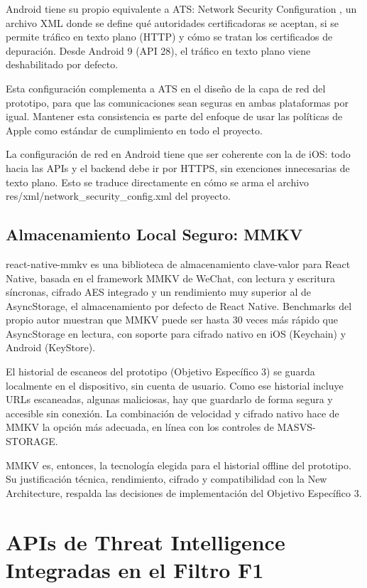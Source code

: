 Android tiene su propio equivalente a ATS: Network Security Configuration \cite{android_netsecconfig}, un archivo XML donde se define qu\'e autoridades certificadoras se aceptan, si se permite tr\'afico en texto plano (HTTP) y c\'omo se tratan los certificados de depuraci\'on. Desde Android 9 (API 28), el tr\'afico en texto plano viene deshabilitado por defecto.

Esta configuraci\'on complementa a ATS en el dise\~no de la capa de red del prototipo, para que las comunicaciones sean seguras en ambas plataformas por igual. Mantener esta consistencia es parte del enfoque de usar las pol\'iticas de Apple como est\'andar de cumplimiento en todo el proyecto.

La configuraci\'on de red en Android tiene que ser coherente con la de iOS: todo hacia las APIs y el backend debe ir por HTTPS, sin exenciones innecesarias de texto plano. Esto se traduce directamente en c\'omo se arma el archivo res/xml/network\_security\_config.xml del proyecto.

\subsection{Almacenamiento Local Seguro: MMKV}

react-native-mmkv \cite{rousavy_mmkv} es una biblioteca de almacenamiento clave-valor para React Native, basada en el framework MMKV de WeChat, con lectura y escritura s\'incronas, cifrado AES integrado y un rendimiento muy superior al de AsyncStorage, el almacenamiento por defecto de React Native. Benchmarks del propio autor \cite{rousavy_storagebenchmark} muestran que MMKV puede ser hasta 30 veces m\'as r\'apido que AsyncStorage en lectura, con soporte para cifrado nativo en iOS (Keychain) y Android (KeyStore).

El historial de escaneos del prototipo (Objetivo Espec\'ifico 3) se guarda localmente en el dispositivo, sin cuenta de usuario. Como ese historial incluye URLs escaneadas, algunas maliciosas, hay que guardarlo de forma segura y accesible sin conexi\'on. La combinaci\'on de velocidad y cifrado nativo hace de MMKV la opci\'on m\'as adecuada, en l\'inea con los controles de MASVS-STORAGE.

MMKV es, entonces, la tecnolog\'ia elegida para el historial offline del prototipo. Su justificaci\'on t\'ecnica, rendimiento, cifrado y compatibilidad con la New Architecture, respalda las decisiones de implementaci\'on del Objetivo Espec\'ifico 3.

\section{APIs de Threat Intelligence Integradas en el Filtro F1}

